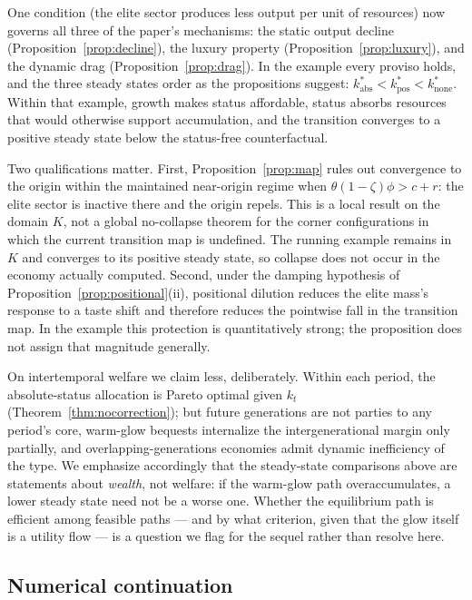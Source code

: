 \documentclass[12pt,letterpaper]{article}
\theoremstyle{definition}
\begin{document}
One condition (the elite sector produces less output per unit of resources) now governs all three of the paper's mechanisms: the static output decline (Proposition~\ref{prop:decline}), the luxury property (Proposition~\ref{prop:luxury}), and the dynamic drag (Proposition~\ref{prop:drag}).
In the example every proviso holds, and the three steady states order as the propositions suggest:
$k^\ast_{\mathrm{abs}}<k^\ast_{\mathrm{pos}}<k^\ast_{\mathrm{none}}$.
Within that example, growth makes status affordable, status absorbs resources that would otherwise support accumulation, and the transition converges to a positive steady state below the status-free counterfactual.

Two qualifications matter.
First, Proposition~\ref{prop:map} rules out convergence to the origin within the maintained near-origin regime when $\theta(1-\zeta)\phi>c+r$: the elite sector is inactive there and the origin repels.
This is a local result on the domain $K$, not a global no-collapse theorem for the corner configurations in which the current transition map is undefined.
The running example remains in $K$ and converges to its positive steady state, so collapse does not occur in the economy actually computed.
Second, under the damping hypothesis of Proposition~\ref{prop:positional}(ii), positional dilution reduces the elite mass's response to a taste shift and therefore reduces the pointwise fall in the transition map.
In the example this protection is quantitatively strong; the proposition does not assign that magnitude generally.

On intertemporal welfare we claim less, deliberately.
Within each period, the absolute-status allocation is Pareto optimal given $k_t$ (Theorem~\ref{thm:nocorrection}); but future generations are not parties to any period's core, warm-glow bequests \citep{andreoni1990} internalize the intergenerational margin only partially, and overlapping-generations economies admit dynamic inefficiency of the \citet{diamond1965} type.
We emphasize accordingly that the steady-state comparisons above are statements about \emph{wealth}, not welfare: if the warm-glow path overaccumulates, a lower steady state need not be a worse one.
Whether the equilibrium path is efficient among feasible paths --- and by what criterion, given that the glow itself is a utility flow --- is a question we flag for the sequel rather than resolve here.

\subsection{Numerical continuation}
\end{document}
